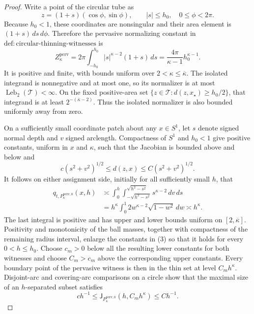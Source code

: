 \documentclass{article}
\begin{document}
\begin{proof}
Write a point of the circular tube as
\[
 z=(1+s)(\cos\phi,\sin\phi),\qquad |s|\le h_0,
 \quad 0\le\phi<2\pi.
\]
Because \(h_0<1\), these coordinates are nonsingular and their area
element is \((1+s)\,ds\,d\phi\).  Therefore the pervasive normalizing
constant in \(\mathrm{def:circular\text{-}thinning\text{-}witnesses}\) is
\[
 Z_{\kappa}^{\mathrm{perv}}
 =2\pi\int_{-h_0}^{h_0}|s|^{\kappa-2}(1+s)\,ds
 =\frac{4\pi}{\kappa-1}h_0^{\kappa-1}.
 \tag{1}
\]
It is positive and finite, with bounds uniform over
\(2<\kappa\le\overline\kappa\).  The isolated integrand is nonnegative
and at most one, so its normalizer is at most
\(\operatorname{Leb}_2(\mathcal T)<\infty\).  On the fixed positive-area
set
\(\{z\in\mathcal T:d(z,x_{\star})\ge h_0/2\}\), that integrand is at
least \(2^{-(\overline\kappa-2)}\).  Thus the isolated normalizer is also
bounded uniformly away from zero.

On a sufficiently small coordinate patch about any \(x\in S^1\), let
\(s\) denote signed normal depth and \(v\) signed arclength.  Compactness
of \(S^1\) and \(h_0<1\) give positive constants, uniform in \(x\) and
\(\kappa\), such that the Jacobian is bounded above and below and
\[
 c(s^2+v^2)^{1/2}\le d(z,x)\le C(s^2+v^2)^{1/2}.
 \tag{2}
\]
It follows on either assignment side, initially for all sufficiently
small \(h\), that
\[
 \begin{aligned}
 q_{t,P_{\kappa}^{\mathrm{perv},0}}(x,h)
 &\asymp
 \int_0^h\int_{-\sqrt{h^2-s^2}}^{\sqrt{h^2-s^2}}
 s^{\kappa-2}\,dv\,ds\\
 &=h^{\kappa}\int_0^1 2w^{\kappa-2}\sqrt{1-w^2}\,dw
 \asymp h^{\kappa}.
 \end{aligned}
 \tag{3}
\]
The last integral is positive and has upper and lower bounds uniform on
\([2,\overline\kappa]\).  Positivity and monotonicity of the ball masses,
together with compactness of the remaining radius interval, enlarge the
constants in (3) so that it holds for every \(0<h\le h_0\).  Choose
\(c_m>0\) below all the resulting lower constants for both witnesses and
choose \(C_m>c_m\) above the corresponding upper constants.  Every
boundary point of the pervasive witness is then in the thin set at level
\(C_mh^{\kappa}\).  Disjoint-arc and covering-arc comparisons on a circle
show that the maximal size of an \(h\)-separated subset satisfies
\[
 c h^{-1}\le \mathsf J_{P_{\kappa}^{\mathrm{perv},0}}
       (h,C_mh^{\kappa})\le C h^{-1}.
 \tag{4}
\]


\end{proof}
\end{document}
